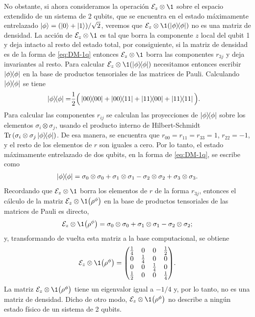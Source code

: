 No obstante, si ahora consideramos la operación $\E_z\otimes\1$ sobre el espacio extendido
de  un sistema de 2 qubits, que se encuentra en el estado máximamente
entrelazado $\ket{\phi}=\qty(\ket{0}+\ket{1})/\sqrt{2}$, veremos 
que $\E_z\otimes\1\qty(\dyad{\phi}{\phi})$  no es una matriz de densidad.
La acción de $\E_z\otimes\1$ es tal que borra la componente
$z$ local del qubit 1 y deja intacto al resto del estado total, por consiguiente,
si la matriz de densidad es de la forma de \eqref{eq:DM-1q} entonces 
$\E_z\otimes\1$ borra las componentes $r_{3j}$ y deja invariantes 
al resto. Para calcular $\E_z\otimes\1\qty(\dyad{\phi}{\phi})$
necesitamos entonces escribir $\dyad{\phi}{\phi}$ en la base
de productos tensoriales de las matrices de Pauli.
Calculando $\dyad{\phi}{\phi}$ se tiene
\begin{align}
\dyad{\phi}{\phi}=& 
\frac{1}{2}
\Big( \dyad{00}{00} + \dyad{00}{11}
+ \dyad{11}{00} + \dyad{11}{11} \Big).
\label{eq:DM-2q-MaxE}
\end{align}
Para calcular las componentes $r_{ij}$ se calculan las
proyecciones de $\dyad{\phi}{\phi}$ sobre
los elementos $\sigma_i\otimes\sigma_j$, usando el producto interno
de Hilbert-Schmidt $\Tr\qty(\pauli{i}{j}\dyad{\phi}{\phi})$.
De esa manera, se encuentra que $r_{00}=r_{11}=r_{33}=1$, $r_{22}=-1$,
y el resto de los elementos de $r$ son iguales a cero. 
Por lo tanto, el estado máximamente entrelazado de
dos qubits, en la forma de \eqref{eq:DM-1q}, se escribe como
\begin{align}
\dyad{\phi}{\phi}=
\pauli{0}{0}+\pauli{1}{1}-\pauli{2}{2}+\pauli{3}{3}.
\end{align}
Recordando que $\E_z\otimes\1$ borra los elementos de $r$ de la forma
$r_{3j}$, entonces el cálculo de la matriz $\E_z\otimes\1 \qty({\rho}^{\phi})$
en la base de productos tensoriales de las matrices de Pauli es directo,
\begin{align}
\E_z\otimes\1 \qty({\rho}^{\phi})=
\pauli{0}{0}+\pauli{1}{1}-\pauli{2}{2};
\end{align}
y, transformando de vuelta esta matriz a la base computacional,
se obtiene
\begin{align}
\E_z\otimes\1 \qty({\rho}^{\phi})=
\mqty( 
\frac{1}{4} & 0 & 0 & \frac{1}{2} \\
0 & \frac{1}{4} & 0 & 0 \\
0 & 0 & \frac{1}{4} & 0 \\
\frac{1}{2} & 0 & 0 & \frac{1}{4} \\
).
\end{align}
La matriz  $\E_z\otimes\1\qty(\rho^{\phi})$ tiene un 
eigenvalor igual a $-1/4$ y, por lo tanto, no es una matriz de densidad.  
Dicho de otro modo, $\E_z\otimes\1\qty(\rho^{\phi})$ 
no describe a ningún estado físico de un sistema de 2 qubits.

